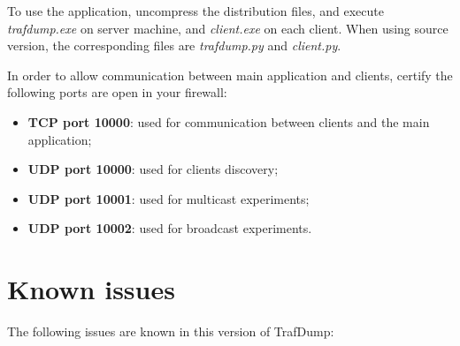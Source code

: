 \documentclass[12pt]{report}
\begin{document}
To use the application, uncompress the distribution files, and execute
\emph{trafdump.exe} on server machine, and \emph{client.exe} on each
client. When using source version, the corresponding files are
\emph{trafdump.py} and \emph{client.py}.

In order to allow communication between main application and clients,
certify the following ports are open in your firewall:

\begin{itemize}

\item \textbf{TCP port 10000}: used for communication between clients and
the main application;

\item \textbf{UDP port 10000}: used for clients discovery;

\item \textbf{UDP port 10001}: used for multicast experiments;

\item \textbf{UDP port 10002}: used for broadcast experiments.

\end{itemize}

\chapter{Known issues}

The following issues are known in this version of TrafDump:
\end{document}
